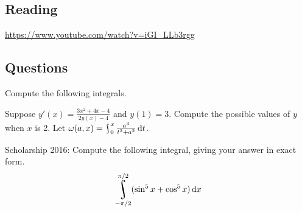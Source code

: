 


\subsection*{Reading}

\begin{center}
\begin{tcolorbox}[width=0.8\textwidth,colback={red},title={\textbf{Go and watch...}},colbacktitle=yellow,coltitle=blue]
  \textcolor{white}{\url{https://www.youtube.com/watch?v=iGI_LLb3rgg}}
\end{tcolorbox}
\end{center}

\subsection*{Questions}
\begin{questions}
  \question Compute the following integrals.
  \question Suppose $ y'(x) = \frac{3x^2 + 4x - 4}{2y(x) - 4} $ and $ y(1) = 3 $. Compute the possible values of $ y $ when $ x $ is 2.
  \question Let $ \omega(a, x) = \rint^x_0 \frac{a^3}{t^2 + a^2} \dif{t} $.
  \question Scholarship 2016: Compute the following integral, giving your answer in exact form.
    \begin{displaymath}
      \rint_{-\pi/2}^{\pi/2} (\sin^5 x + \cos^5 x) \dif{x}
    \end{displaymath}
\end{questions}


